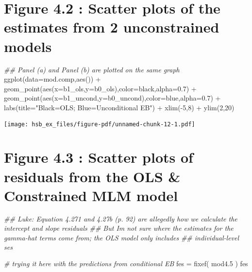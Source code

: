 \documentclass[
  letterpaper,
  DIV=11,
  numbers=noendperiod]{scrreprt}
\newenvironment{Shaded}{}{}
\newcommand{\AttributeTok}[1]{\textcolor[rgb]{0.49,0.56,0.16}{#1}}
\newcommand{\CommentTok}[1]{\textcolor[rgb]{0.38,0.63,0.69}{\textit{#1}}}
\newcommand{\DecValTok}[1]{\textcolor[rgb]{0.25,0.63,0.44}{#1}}
\newcommand{\DocumentationTok}[1]{\textcolor[rgb]{0.73,0.13,0.13}{\textit{#1}}}
\newcommand{\FloatTok}[1]{\textcolor[rgb]{0.25,0.63,0.44}{#1}}
\newcommand{\FunctionTok}[1]{\textcolor[rgb]{0.02,0.16,0.49}{#1}}
\newcommand{\NormalTok}[1]{#1}
\newcommand{\OtherTok}[1]{\textcolor[rgb]{0.00,0.44,0.13}{#1}}
\newcommand{\SpecialCharTok}[1]{\textcolor[rgb]{0.25,0.44,0.63}{#1}}
\newcommand{\StringTok}[1]{\textcolor[rgb]{0.25,0.44,0.63}{#1}}
\begin{document}
\section{Figure 4.2 : Scatter plots of the estimates from 2
unconstrained
models}\label{figure-4.2-scatter-plots-of-the-estimates-from-2-unconstrained-models}

\begin{Shaded}
\begin{Highlighting}[]
\DocumentationTok{\#\# Panel (a) and Panel (b) are plotted on the same graph }
\FunctionTok{ggplot}\NormalTok{(}\AttributeTok{data=}\NormalTok{mod.comp,}\FunctionTok{aes}\NormalTok{()) }\SpecialCharTok{+} 
  \FunctionTok{geom\_point}\NormalTok{(}\FunctionTok{aes}\NormalTok{(}\AttributeTok{x=}\NormalTok{b1\_ols,}\AttributeTok{y=}\NormalTok{b0\_ols),}\AttributeTok{color=}\StringTok{\textquotesingle{}black\textquotesingle{}}\NormalTok{,}\AttributeTok{alpha=}\FloatTok{0.7}\NormalTok{) }\SpecialCharTok{+} 
  \FunctionTok{geom\_point}\NormalTok{(}\FunctionTok{aes}\NormalTok{(}\AttributeTok{x=}\NormalTok{b1\_uncond,}\AttributeTok{y=}\NormalTok{b0\_uncond),}\AttributeTok{color=}\StringTok{\textquotesingle{}blue\textquotesingle{}}\NormalTok{,}\AttributeTok{alpha=}\FloatTok{0.7}\NormalTok{) }\SpecialCharTok{+} 
  \FunctionTok{labs}\NormalTok{(}\AttributeTok{title=}\StringTok{"Black=OLS; Blue=Unconditional EB"}\NormalTok{) }\SpecialCharTok{+}
  \FunctionTok{xlim}\NormalTok{(}\SpecialCharTok{{-}}\DecValTok{5}\NormalTok{,}\DecValTok{8}\NormalTok{) }\SpecialCharTok{+} \FunctionTok{ylim}\NormalTok{(}\DecValTok{2}\NormalTok{,}\DecValTok{20}\NormalTok{)}
\end{Highlighting}
\end{Shaded}

\texttt{[image: hsb\_ex\_files/figure-pdf/unnamed-chunk-12-1.pdf]}

\section{Figure 4.3 : Scatter plots of residuals from the OLS \&
Constrained MLM
model}\label{figure-4.3-scatter-plots-of-residuals-from-the-ols-constrained-mlm-model}

\begin{Shaded}
\begin{Highlighting}[]
\DocumentationTok{\#\# Luke: Equation 4.271 and 4.27b (p. 92) are allegedly how we calculate the intercept and slope residuals }
\DocumentationTok{\#\# But I\textquotesingle{}m not sure where the estimates for the gamma{-}hat terms come from; the OLS model only includes}
\DocumentationTok{\#\# individual{-}level ses}

\CommentTok{\# trying it here with the predictions from conditional EB}
\NormalTok{fes }\OtherTok{=} \FunctionTok{fixef}\NormalTok{( mod4}\FloatTok{.5}\NormalTok{ )}
\NormalTok{fes}
\end{Highlighting}
\end{Shaded}
\end{document}
